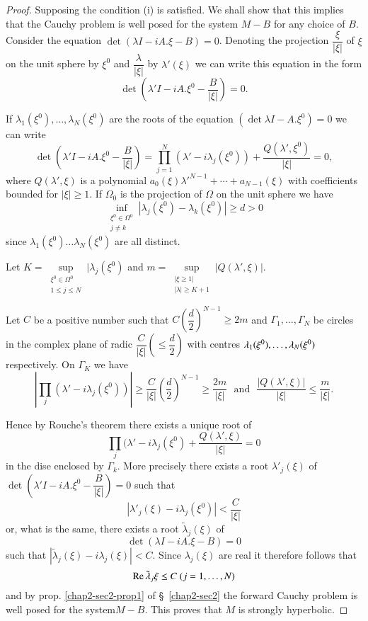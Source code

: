 \begin{proof}
Supposing the condition (i) is satisfied. We shall show that this
implies that the Cauchy problem is well posed for the system $M-B$ for
any choice of $B$.  Consider the equation $\det(\lambda I - iA. \xi -
B) = 0$. Denoting the projection $\dfrac{\xi}{|\xi|}$ of $\xi $ on
the unit sphere by $\xi^0$ and $\dfrac{\lambda}{|\xi |}$ by $\lambda'
(\xi)$ we can write this equation in the form  
$$
\det (\lambda' I - iA. \xi^0 - \frac{B}{|\xi|}) = 0. 
$$

If $ \lambda_1 (\xi^0),  \ldots,  \lambda_N(\xi^0) $ are the roots of
the equation  $(\det \lambda I - A. \xi^0 ) = 0 $ we can write  
\begin{equation}
\det (\lambda' I - iA. \xi^0 - \frac{B}{|\xi |}) = \prod
\limits^N_{j=1}(\lambda' - i \lambda_j (\xi^0 ))  + \frac{Q (\lambda'
  ,  \xi^0 ) }{|\xi | } = 0 , \tag{5.6}\label{chap2-eq5.6}  
\end{equation} 
where $Q(\lambda',  \xi)$ is a polynomial $a_0 (\xi) \lambda'^{N-1} +
\cdots + a_{N-1} (\xi )$ with  coefficients bounded for $|\xi |  \geq
1$. If $\Omega_0$ is the projection of $\Omega $ on the unit sphere we
have  
$$
\inf_{\substack{\xi^0 \in \Omega^0\\ j \neq k}} | \lambda_j 
(\xi^0) - \lambda_k (\xi^0) | \geq d > 0 
$$\pageoriginale
since $\lambda_{1}(\xi^0) \ldots \lambda_N (\xi^0) $ are all distinct.

Let $ K= \sup\limits_{\substack{\xi^0 \in \Omega^0 \\ 1\leq j\leq N}}  |
\lambda_j (\xi^0)$ and $m=\sup\limits_{\substack{|\xi \geq 1|\\ |\lambda|
    \geq K+1}} |Q(\lambda',  \xi)|$.  

Let $C$ be a positive number such that $C\left(\dfrac{d}{2}\right)^{N-1} \geq 2m
$ and $\Gamma_1 ,  \ldots ,  \Gamma_N$ be circles in the complex plane
of radic $\dfrac{C}{|\xi|}\left(\leq \dfrac{d}{2}\right)$ with centres
$\lambda_1 (\xi^0),\break  \ldots , \lambda_N (\xi^0)$ respectively. On $\Gamma_K$ we
have  
$$
\left|\prod_j (\lambda'- i \lambda_j (\xi^0))\right| \geq 
\frac{C}{|\xi|}\left(\frac{d}{2}\right)^{N-1} \geq \frac{2m}{|\xi|}
\text{~ and~ } \frac{|Q (\lambda',\xi)|}{|\xi|} \leq \frac{m}{|\xi|}. 
$$

Hence by Rouche's theorem there exists a unique root of 
$$
\prod_j (\lambda'- i \lambda_j (\xi^0)+ \frac{Q (\lambda',
  \xi)}{|\xi|}=0 
$$
in the dise enclosed by $\Gamma_k$. More precisely there exists a root
$\lambda'_j (\xi)$ of  $\det(\lambda'I - i A.  \xi^0-
\dfrac{B}{|\xi|}) = 0$ such that  
$$
\left| \lambda'_j (\xi)- i \lambda_j (\xi^0) \right|< \frac{C}{|\xi|} 
$$
or, what is the same,  there exists a root $\tilde{\lambda}_j (\xi)$ of  
$$
\det(\lambda I - i A. \xi - B) = 0
$$
such that $ |\tilde{\lambda}_j (\xi)- i \lambda_j (\xi)| < C$. Since
$\lambda_j(\xi)$ are real it therefore follows that  
$$
\operatorname{Re} \tilde{\lambda}_j {\xi} \leq C\ (j=1,  \ldots ,  N) 
$$
and by prop. \ref{chap2-sec2-prop1} of \S\ \ref{chap2-sec2} the
forward Cauchy problem is well posed for the  
system\pageoriginale $M-B$. This proves that $M$ is strongly
hyperbolic.  


\end{proof}
